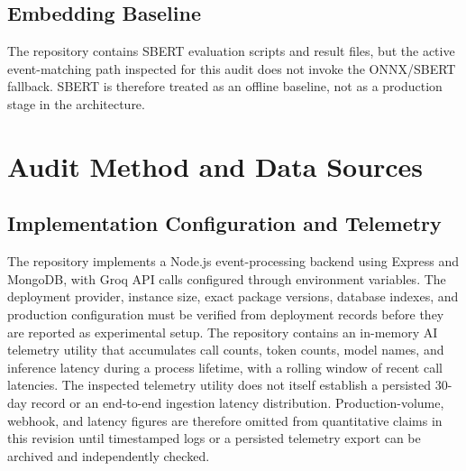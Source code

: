 \documentclass[sigconf,natbib=true,anonymous=true]{acmart}
\begin{document}
\subsection{Embedding Baseline}
The repository contains SBERT evaluation scripts and result files, but the active event-matching path inspected for this audit does not invoke the ONNX/SBERT fallback. SBERT is therefore treated as an offline baseline, not as a production stage in the architecture.

\section{Audit Method and Data Sources}

\subsection{Implementation Configuration and Telemetry}
The repository implements a Node.js event-processing backend using Express and MongoDB, with Groq API calls configured through environment variables. The deployment provider, instance size, exact package versions, database indexes, and production configuration must be verified from deployment records before they are reported as experimental setup. The repository contains an in-memory AI telemetry utility that accumulates call counts, token counts, model names, and inference latency during a process lifetime, with a rolling window of recent call latencies. The inspected telemetry utility does not itself establish a persisted 30-day record or an end-to-end ingestion latency distribution. Production-volume, webhook, and latency figures are therefore omitted from quantitative claims in this revision until timestamped logs or a persisted telemetry export can be archived and independently checked.

\begin{table}[!t]
\centering
\caption{Technology Stack Identified in the Repository}
\label{tab:tech}
\end{table}
\end{document}
